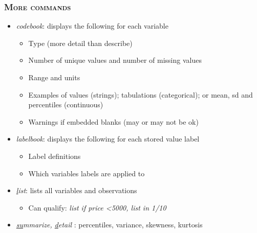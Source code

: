 \documentclass[10pt]{beamer}
\begin{document}
	\begin{frame}
		\frametitle{\textsc{More commands}}
		\begin{itemize}
			\item 	\textit{codebook}: displays the following for each variable
		
			\begin{itemize}
				\item Type (more detail than describe)
				\item Number of unique values and number of missing values
				\item Range and units
				\item Examples of values (strings); tabulations (categorical); or mean, sd and percentiles (continuous)
				\item Warnings if embedded blanks (may or may not be ok)
			\end{itemize}
			\item \textit{labelbook}: displays the following for each stored value label
			\begin{itemize}
				\item Label definitions
				\item Which variables labels are applied to
			\end{itemize}
			\item \textit{\underline{l}ist}: lists all variables and observations
			\begin{itemize}
				\item Can qualify: \textit{list if price \textless 5000, list in 1/10}
			\end{itemize}
			\item \textit{\underline{su}mmarize, \underline{d}etail} : percentiles, variance, skewness, kurtosis
			
		\end{itemize}
	\end{frame}
\end{document}

